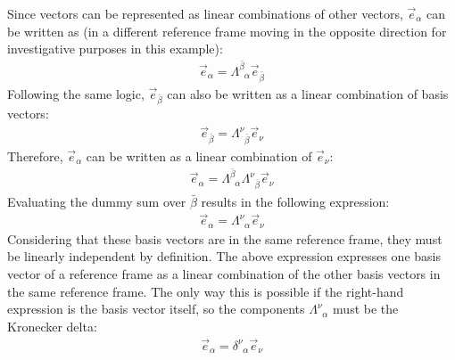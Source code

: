 \documentclass{report}
\begin{document}
\begin{subquests}
\begin{subquests}
		\item
		Since vectors can be represented as linear combinations of other vectors, ${\vec e}_{\alpha}$ can be written as (in a different reference frame moving in the opposite direction for investigative purposes in this example):
		\begin{gather*}
			{\vec e}_{\alpha} = \Lambda^{\bar{\beta}}_{\;\;\alpha}{\vec e}_{{\bar{\beta}}}
		\end{gather*}
		Following the same logic, ${\vec e}_{\bar{\beta}}$ can also be written as a linear combination of basis vectors:
		\begin{gather*}
			{\vec e}_{\bar{\beta}} = \Lambda^{\nu}_{\;\;\bar{\beta}}{\vec e}_{\nu}
		\end{gather*}
		Therefore, ${\vec e}_{\alpha}$ can be written as a linear combination of ${\vec e}_{\nu}$:
		\begin{gather*}
			{\vec e}_{\alpha} = \Lambda^{\bar{\beta}}_{\;\;\alpha}\Lambda^{\nu}_{\;\;\bar{\beta}}{\vec e}_{\nu}
		\end{gather*}
		Evaluating the dummy sum over $\bar{\beta}$ results in the following expression:
		\begin{gather*}
			{\vec e}_{\alpha} = \Lambda^{\nu}_{\;\;\alpha}{\vec e}_{\nu}
		\end{gather*}
		Considering that these basis vectors are in the same reference frame, they must be linearly independent by definition. The above expression expresses one basis vector of a reference frame as a linear combination of the other basis vectors in the same reference frame. The only way this is possible if the right-hand expression is the basis vector itself, so the components $\Lambda^{\nu}_{\;\;\alpha}$ must be the Kronecker delta: 
		\begin{gather*}
			{\vec e}_{\alpha} = \delta^{\nu}_{\;\;\alpha}{\vec e}_{\nu}
		\end{gather*}
	\end{subquests}


\end{subquests}
\end{document}
